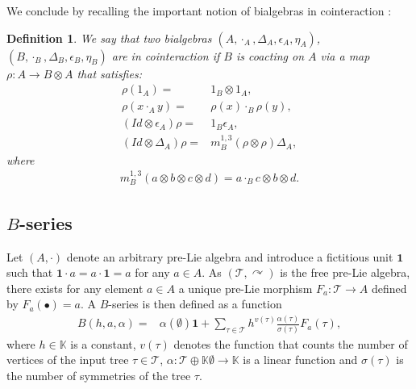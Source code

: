 \documentclass[10pt,a4paper]{article}
\newtheorem{definition}{Definition}
\begin{document}
We conclude by recalling the important notion of bialgebras in cointeraction \cite{Foissy2017,ManchonAbel}:

\begin{definition} 
\label{def::cointeraction}
We say that two bialgebras $(A,\cdot_{\scriptscriptstyle{A}},\Delta_A,\epsilon_A,\eta_A)$, $(B,\cdot_{\scriptscriptstyle{B}},\Delta_B,\epsilon_B,\eta_B)$ are in cointeraction if $B$ is coacting on $A$ via a map $\rho: A \to B \otimes A$ that satisfies:
\begin{align*}
\rho(1_A)=&1_B \otimes 1_A, \\
\rho(x \cdot_{\scriptscriptstyle{A}} y)=&\rho(x) \cdot_{\scriptscriptstyle{B}} \rho(y), \\
(Id \otimes \epsilon_A)\rho=&1_B \epsilon_A, \\
(Id \otimes \Delta_A)\rho=&m_{\scriptscriptstyle{B}}^{1,3}(\rho \otimes \rho)\Delta_A,
\end{align*}
where 
\begin{align*}
m_{\scriptscriptstyle{B}}^{1,3}(a \otimes b \otimes c \otimes d)=a \cdot_{\scriptscriptstyle{B}}c \otimes b \otimes d.
\end{align*}
\end{definition}


\subsection{$B$-series}
\label{ssec:Bseries}

Let $(A,\cdot)$ denote an arbitrary pre-Lie algebra and introduce a fictitious unit $\mathbf{1}$ such that $\mathbf{1} \cdot a = a \cdot \mathbf{1} =a$ for any $a \in A$. As $(\mathcal{T},\curvearrowright)$ is the free pre-Lie algebra, there exists for any element $a \in A$ a unique pre-Lie morphism $F_a: \mathcal{T} \to A$ defined by $F_a (\bullet)=a$. A $B$-series is then defined as a function
\begin{align*}
B(h,a,\alpha)=&\alpha(\emptyset)\mathbf{1}+\sum_{\tau \in \mathcal{T}}h^{v(\tau)}\frac{\alpha(\tau)}{\sigma(\tau)}F_a(\tau),
\end{align*}
where $h \in \mathbb{K}$ is a constant, $v(\tau)$ denotes the function that counts the number of vertices of the input tree $\tau \in \mathcal{T}$, $\alpha: \mathcal{T}\oplus \mathbb{K}\emptyset \to \mathbb{K}$ is a linear function and $\sigma(\tau)$ is the number of symmetries of the tree $\tau$. \\
\end{document}
